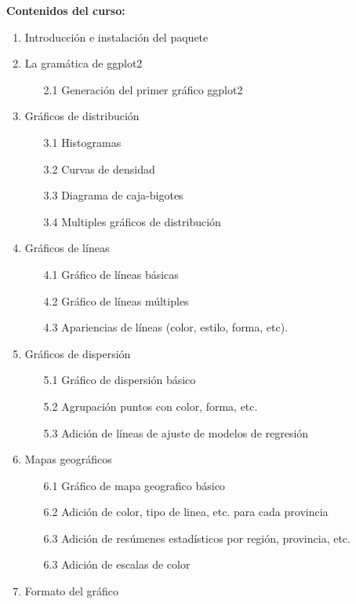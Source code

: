 \documentclass[12pt,a4paper,oneside]{article}\usepackage[]{graphicx}\usepackage[]{color}
\begin{document}
{\bf \large Contenidos del curso:}
\begin{enumerate}
   \item Introducción e instalación del paquete
   \item La gramática de ggplot2
   \begin{enumerate}
   \item[2.1] Generación del primer gráfico ggplot2
   \end{enumerate}
   \item{Gráficos de distribución}
   \begin{enumerate}
      \item[3.1] Histogramas
      \item[3.2] Curvas de densidad
      \item[3.3] Diagrama de caja-bigotes
      \item[3.4] Multiples gráficos de distribución
   \end{enumerate}
   \item{Gráficos de líneas}
   \begin{enumerate}
      \item[4.1] Gráfico de líneas básicas
      \item[4.2] Gráfico de líneas múltiples
      \item[4.3] Apariencias de líneas (color, estilo, forma, etc).
   \end{enumerate}
   \item{Gráficos de dispersión}
   \begin{enumerate}
      \item[5.1] Gráfico de dispersión básico
      \item[5.2] Agrupación puntos con color, forma, etc.
      \item[5.3] Adición de líneas de ajuste de modelos de regresión
   \end{enumerate}
   \item{Mapas geográficos}
   \begin{enumerate}
      \item[6.1] Gráfico de mapa geografico básico
      \item[6.2] Adición de color, tipo de linea, etc. para cada provincia
      \item[6.3] Adición de resúmenes estadísticos por región, provincia, etc.
      \item[6.3] Adición de escalas de color
   \end{enumerate}
   \item{Formato del gráfico}
   \begin{enumerate}

\end{enumerate}
\end{enumerate}
\end{document}
